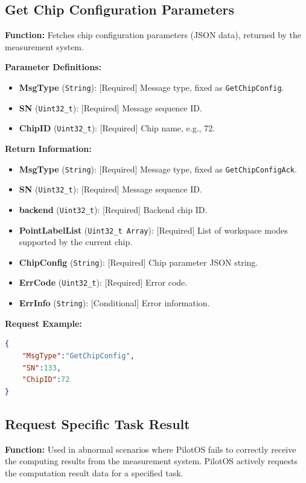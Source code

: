 \documentclass[12pt, a4paper]{article}
\begin{document}
\subsection{Get Chip Configuration Parameters}

\textbf{Function:} Fetches chip configuration parameters (JSON data), returned by the measurement system.

\textbf{Parameter Definitions:}
\begin{itemize}
    \item \textbf{MsgType} (\texttt{String}): [Required] Message type, fixed as \texttt{GetChipConfig}.
    \item \textbf{SN} (\texttt{Uint32\_t}): [Required] Message sequence ID.
    \item \textbf{ChipID} (\texttt{Uint32\_t}): [Required] Chip name, e.g., 72.
\end{itemize}

\textbf{Return Information:}
\begin{itemize}
    \item \textbf{MsgType} (\texttt{String}): [Required] Message type, fixed as \texttt{GetChipConfigAck}.
    \item \textbf{SN} (\texttt{Uint32\_t}): [Required] Message sequence ID.
    \item \textbf{backend} (\texttt{Uint32\_t}): [Required] Backend chip ID.
    \item \textbf{PointLabelList} (\texttt{Uint32\_t Array}): [Required] List of workspace modes supported by the current chip.
    \item \textbf{ChipConfig} (\texttt{String}): [Required] Chip parameter JSON string.
    \item \textbf{ErrCode} (\texttt{Uint32\_t}): [Required] Error code.
    \item \textbf{ErrInfo} (\texttt{String}): [Conditional] Error information.
\end{itemize}

\noindent \textbf{Request Example:}
\begin{lstlisting}[language=json]
{
    "MsgType":"GetChipConfig",
    "SN":133,
    "ChipID":72
}
\end{lstlisting}

\subsection{Request Specific Task Result}

\textbf{Function:} Used in abnormal scenarios where PilotOS fails to correctly receive the computing results from the measurement system. PilotOS actively requests the computation result data for a specified task.
\end{document}
